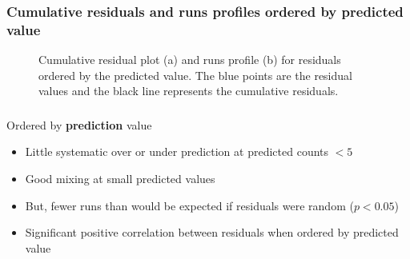 \begin{frame}[fragile]
\frametitle{Cumulative residuals and runs profiles ordered by predicted value}
\begin{figure}[h]
  \centering
    \caption{Cumulative residual plot (a) and runs profile (b) for residuals ordered by the predicted value.  The blue points are the residual values and the black line represents the cumulative residuals.}
  \label{fig:geeruns2}
\end{figure}
\end{frame}

\begin{frame}[fragile]
\frametitle{}
Ordered by \textbf{prediction} value
\begin{itemize}
\item Little systematic over or under prediction at predicted counts $< 5$
\item Good mixing at small predicted values
\item But, fewer runs than would be expected if residuals were random ($p<0.05$)
\item Significant positive correlation between residuals when ordered by predicted value
\end{itemize}
\end{frame}

